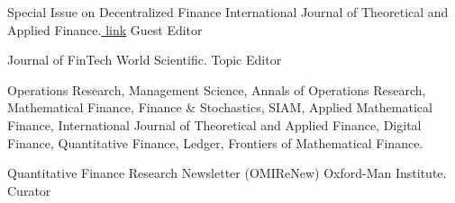 \begin{center}
    
\end{center}

\begin{cvhonors}
    \cvhonorrr
    {Special Issue on Decentralized Finance}
    {International Journal of Theoretical and Applied Finance.\href{https://www.worldscientific.com/page/ijtaf/callforpapers04}{ \color{teal}\underline{link}}}
    {}
    {Guest Editor} %

    \cvhonorrr
    {Journal of FinTech}
    {World Scientific.}
    {}
    {Topic Editor} %

    \cvhonorrr
    {  }
    {Operations Research, Management Science, Annals of Operations Research, Mathematical Finance, Finance \& Stochastics, SIAM, Applied Mathematical Finance, International Journal of Theoretical and Applied Finance, Digital Finance, Quantitative Finance, Ledger, Frontiers of Mathematical Finance.}
    {}
    {} %

    \cvhonorrr
    {Quantitative Finance Research Newsletter (OMIReNew)}
    {Oxford-Man Institute.}
    {} 
    {Curator} %
    
\end{cvhonors}
